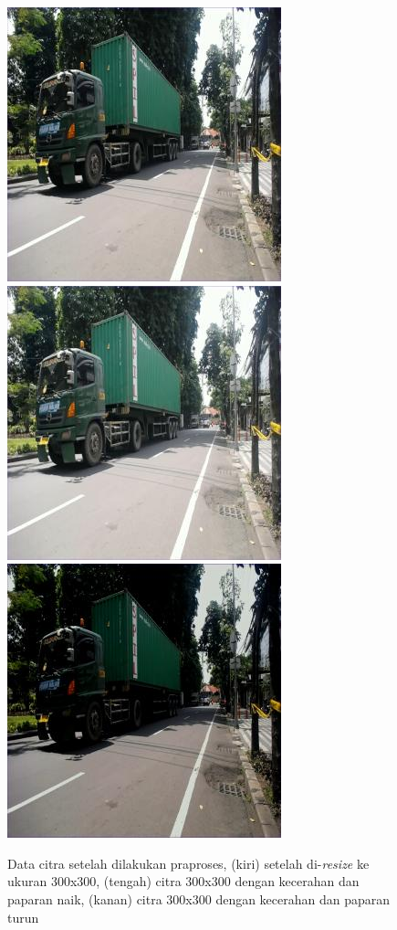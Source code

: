 \begin{figure}[htbp]
  \centering

  \includegraphics[scale=0.45]{gambar/bab3-citra-300x300.jpg}
  \includegraphics[scale=0.45]{gambar/bab3-citra-300x300-brightness-up.jpg}
  \includegraphics[scale=0.45]{gambar/bab3-citra-300x300-brightness-down.jpg}

  \caption{\centering Data citra setelah dilakukan praproses, (kiri) setelah di-\emph{resize} ke ukuran 300x300, (tengah) citra 300x300 dengan kecerahan dan paparan naik, (kanan) citra 300x300 dengan kecerahan dan paparan turun}
  \label{fig:preprocessingdata}
\end{figure}

